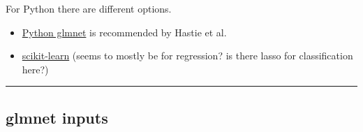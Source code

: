\documentclass[
  letterpaper,
  DIV=11,
  numbers=noendperiod]{scrartcl}
\providecommand{\tightlist}{%
  \setlength{\itemsep}{0pt}\setlength{\parskip}{0pt}}\usepackage{longtable,booktabs,array}
\begin{document}
For Python there are different options.

\begin{itemize}
\tightlist
\item
  \href{https://web.stanford.edu/~hastie/glmnet_python/}{Python glmnet}
  is recommended by Hastie et al.
\item
  \href{https://scikit-learn.org/stable/modules/linear_model.html\#ridge-regression-and-classification}{scikit-learn}
  (seems to mostly be for regression? is there lasso for classification
  here?)
\end{itemize}

\begin{center}\rule{0.5\linewidth}{0.5pt}\end{center}

\hypertarget{glmnet-inputs}{%
\subsection{glmnet inputs}\label{glmnet-inputs}}
\end{document}
